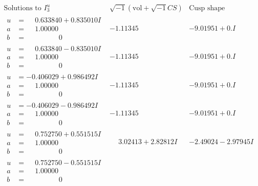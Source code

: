 \documentclass[1p]{elsarticle_modified}
\theoremstyle{definition}
\newcommand{\I}{\sqrt{-1}}
\begin{document}
$$\begin{array}{c|c|c}  
\text{Solutions to }I^u_{3}& \I (\text{vol} + \sqrt{-1}CS) & \text{Cusp shape}\\
 \hline 
\begin{aligned}
u &= \phantom{-}0.633840 + 0.835010 I \\
a &= \phantom{-}1.00000\phantom{ +0.000000I} \\
b &= \phantom{-0.000000 } 0\end{aligned}
 & -1.11345\phantom{ +0.000000I} & -9.01951 + 0. I\phantom{ +0.000000I} \\ \hline\begin{aligned}
u &= \phantom{-}0.633840 - 0.835010 I \\
a &= \phantom{-}1.00000\phantom{ +0.000000I} \\
b &= \phantom{-0.000000 } 0\end{aligned}
 & -1.11345\phantom{ +0.000000I} & -9.01951 + 0. I\phantom{ +0.000000I} \\ \hline\begin{aligned}
u &= -0.406029 + 0.986492 I \\
a &= \phantom{-}1.00000\phantom{ +0.000000I} \\
b &= \phantom{-0.000000 } 0\end{aligned}
 & -1.11345\phantom{ +0.000000I} & -9.01951 + 0. I\phantom{ +0.000000I} \\ \hline\begin{aligned}
u &= -0.406029 - 0.986492 I \\
a &= \phantom{-}1.00000\phantom{ +0.000000I} \\
b &= \phantom{-0.000000 } 0\end{aligned}
 & -1.11345\phantom{ +0.000000I} & -9.01951 + 0. I\phantom{ +0.000000I} \\ \hline\begin{aligned}
u &= \phantom{-}0.752750 + 0.551515 I \\
a &= \phantom{-}1.00000\phantom{ +0.000000I} \\
b &= \phantom{-0.000000 } 0\end{aligned}
 & \phantom{-}3.02413 + 2.82812 I & -2.49024 - 2.97945 I \\ \hline\begin{aligned}
u &= \phantom{-}0.752750 - 0.551515 I \\
a &= \phantom{-}1.00000\phantom{ +0.000000I} \\
b &= \phantom{-0.000000 } 0\end{aligned}

\end{array}$$
\end{document}
